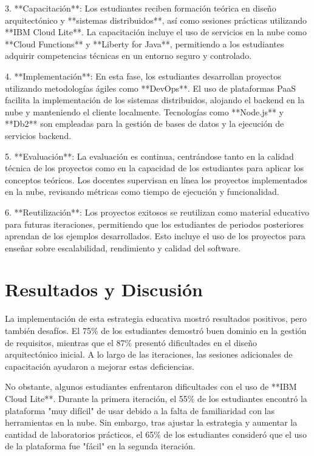 \documentclass[9pt,twocolumn,twoside]{opticajnl}
\begin{document}
3. **Capacitación**: Los estudiantes reciben formación teórica en diseño arquitectónico y **sistemas distribuidos**, así como sesiones prácticas utilizando **IBM Cloud Lite**. La capacitación incluye el uso de servicios en la nube como **Cloud Functions** y **Liberty for Java**, permitiendo a los estudiantes adquirir competencias técnicas en un entorno seguro y controlado.

4. **Implementación**: En esta fase, los estudiantes desarrollan proyectos utilizando metodologías ágiles como **DevOps**. El uso de plataformas PaaS facilita la implementación de los sistemas distribuidos, alojando el backend en la nube y manteniendo el cliente localmente. Tecnologías como **Node.js** y **Db2** son empleadas para la gestión de bases de datos y la ejecución de servicios backend.

5. **Evaluación**: La evaluación es continua, centrándose tanto en la calidad técnica de los proyectos como en la capacidad de los estudiantes para aplicar los conceptos teóricos. Los docentes supervisan en línea los proyectos implementados en la nube, revisando métricas como tiempo de ejecución y funcionalidad.

6. **Reutilización**: Los proyectos exitosos se reutilizan como material educativo para futuras iteraciones, permitiendo que los estudiantes de periodos posteriores aprendan de los ejemplos desarrollados. Esto incluye el uso de los proyectos para enseñar sobre escalabilidad, rendimiento y calidad del software.

\section{Resultados y Discusión}
La implementación de esta estrategia educativa mostró resultados positivos, pero también desafíos. El 75\% de los estudiantes demostró buen dominio en la gestión de requisitos, mientras que el 87\% presentó dificultades en el diseño arquitectónico inicial. A lo largo de las iteraciones, las sesiones adicionales de capacitación ayudaron a mejorar estas deficiencias.

No obstante, algunos estudiantes enfrentaron dificultades con el uso de **IBM Cloud Lite**. Durante la primera iteración, el 55\% de los estudiantes encontró la plataforma "muy difícil" de usar debido a la falta de familiaridad con las herramientas en la nube. Sin embargo, tras ajustar la estrategia y aumentar la cantidad de laboratorios prácticos, el 65\% de los estudiantes consideró que el uso de la plataforma fue "fácil" en la segunda iteración.
\end{document}
